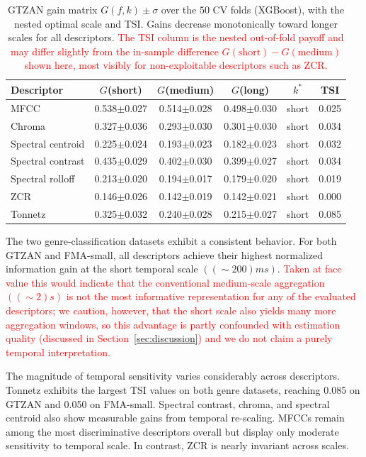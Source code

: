 \documentclass[runningheads]{llncs}
\begin{document}
\begin{table}[!htp]
\centering
{
\caption{GTZAN gain matrix $G(f,k)\pm\sigma$ over the $50$ CV folds (XGBoost), with the nested optimal scale and TSI. Gains decrease monotonically toward longer scales for all descriptors. \textcolor{red}{The TSI column is the nested out-of-fold payoff and may differ slightly from the in-sample difference $G(\mathrm{short})-G(\mathrm{medium})$ shown here, most visibly for non-exploitable descriptors such as ZCR.}}
\label{tab:gain_gtzan}
\begin{tabular}{|l|ccc|c|c|}
\hline
Descriptor & $G$(short) & $G$(medium) & $G$(long) & $k^*$ & TSI \\
\hline
MFCC              & 0.538$\pm$0.027 & 0.514$\pm$0.028 & 0.498$\pm$0.030 & short & 0.025 \\
Chroma            & 0.327$\pm$0.036 & 0.293$\pm$0.030 & 0.301$\pm$0.030 & short & 0.034 \\
Spectral centroid & 0.225$\pm$0.024 & 0.193$\pm$0.023 & 0.182$\pm$0.023 & short & 0.032 \\
Spectral contrast & 0.435$\pm$0.029 & 0.402$\pm$0.030 & 0.399$\pm$0.027 & short & 0.034 \\
Spectral rolloff  & 0.213$\pm$0.020 & 0.194$\pm$0.017 & 0.179$\pm$0.020 & short & 0.019 \\
ZCR               & 0.146$\pm$0.026 & 0.142$\pm$0.019 & 0.142$\pm$0.021 & short & 0.000 \\
Tonnetz           & 0.325$\pm$0.032 & 0.240$\pm$0.028 & 0.215$\pm$0.027 & short & 0.085 \\
\hline
\end{tabular}}
\end{table}

The two genre-classification datasets exhibit a consistent behavior. For both GTZAN and FMA-small, all descriptors achieve their highest normalized information gain at the short temporal scale $((\sim 200)ms)$. \textcolor{red}{Taken at face value this would indicate that the conventional medium-scale aggregation $((\sim 2)s)$ is not the most informative representation for any of the evaluated descriptors; we caution, however, that the short scale also yields many more aggregation windows, so this advantage is partly confounded with estimation quality (discussed in Section~\ref{sec:discussion}) and we do not claim a purely temporal interpretation.}

The magnitude of temporal sensitivity varies considerably across descriptors. Tonnetz exhibits the largest TSI values on both genre datasets, reaching 0.085 on GTZAN and 0.050 on FMA-small. Spectral contrast, chroma, and spectral centroid also show measurable gains from temporal re-scaling. MFCCs remain among the most discriminative descriptors overall but display only moderate sensitivity to temporal scale. In contrast, ZCR is nearly invariant across scales.
\end{document}
